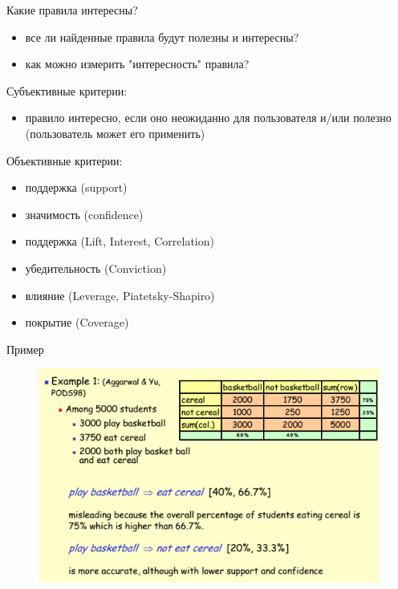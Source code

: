 \documentclass{beamer}
\begin{document}
\begin{frame}{Какие правила интересны?}
\begin{itemize}
\item все ли найденные правила будут полезны и интересны?
\item как можно измерить "интересность" правила?
\end{itemize}
Субъективные критерии:
\begin{itemize}
\item правило интересно, если оно неожиданно для пользователя и/или полезно (пользователь может его применить)
\end{itemize}
Объективные критерии:
\begin{itemize}
\item поддержка (support)
\item значимость (confidence)
\item поддержка (Lift, Interest, Correlation) 
\item убедительность (Conviction)
\item влияние (Leverage, Piatetsky-Shapiro)
\item покрытие (Coverage)
\end{itemize}
\end{frame}

\begin{frame}{Пример}
\begin{figure}[h]
\centering
\includegraphics[scale=0.6]{images/lec08-pic21.png}
\end{figure}
\end{frame}
\end{document}
